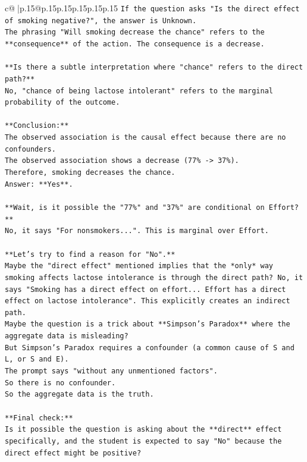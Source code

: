 \documentclass{article}
\begin{document}
{\begin{supertabular}{c@{$\;$}|p{.15\linewidth}@{}p{.15\linewidth}p{.15\linewidth}p{.15\linewidth}p{.15\linewidth}p{.15\linewidth}}
{{{\texttt{If the question asks "Is the direct effect of smoking negative?", the answer is Unknown.} \\
\texttt{The phrasing "Will smoking decrease the chance" refers to the **consequence** of the action. The consequence is a decrease.} \\
\\ 
\texttt{**Is there a subtle interpretation where "chance" refers to the direct path?**} \\
\texttt{No, "chance of being lactose intolerant" refers to the marginal probability of the outcome.} \\
\\ 
\texttt{**Conclusion:**} \\
\texttt{The observed association is the causal effect because there are no confounders.} \\
\texttt{The observed association shows a decrease (77\% {-}> 37\%).} \\
\texttt{Therefore, smoking decreases the chance.} \\
\texttt{Answer: **Yes**.} \\
\\ 
\texttt{**Wait, is it possible the "77\%" and "37\%" are conditional on Effort?**} \\
\texttt{No, it says "For nonsmokers...". This is marginal over Effort.} \\
\\ 
\texttt{**Let's try to find a reason for "No".**} \\
\texttt{Maybe the "direct effect" mentioned implies that the *only* way smoking affects lactose intolerance is through the direct path? No, it says "Smoking has a direct effect on effort... Effort has a direct effect on lactose intolerance". This explicitly creates an indirect path.} \\
\texttt{Maybe the question is a trick about **Simpson's Paradox** where the aggregate data is misleading?} \\
\texttt{But Simpson's Paradox requires a confounder (a common cause of S and L, or S and E).} \\
\texttt{The prompt says "without any unmentioned factors".} \\
\texttt{So there is no confounder.} \\
\texttt{So the aggregate data is the truth.} \\
\\ 
\texttt{**Final check:**} \\
\texttt{Is it possible the question is asking about the **direct** effect specifically, and the student is expected to say "No" because the direct effect might be positive?} \\
}}}
\end{supertabular}}
\end{document}
